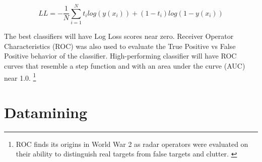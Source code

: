 \documentclass[fleqn,10pt]{SelfArx} %
\begin{document}
$$LL = - \frac{1}{N} \sum_{i=1}^N t_i log(y(x_i)) + (1-t_i) log(1-y(x_i))$$

The best classifiers will have Log Loss scores near zero.  Receiver Operator Characteristics (ROC) was also used to evaluate the True Positive vs False Positive behavior of the classifier.  High-performing classifier will have ROC curves that resemble a step function and with an area under the curve (AUC) near 1.0.  \footnote{ROC finds its origins in World War 2 as radar operators were evaluated on their ability to distinguish real targets from false targets and clutter. \cite{Lusted1217}}


\section{Datamining}
\end{document}
